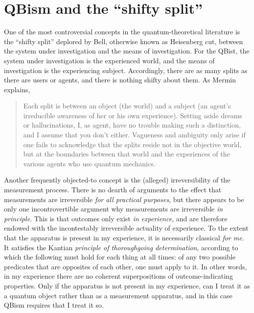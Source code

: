 \documentclass[smallextended]{svjour3}
\newcommand{\bq}{\begin{quote}}
\newcommand{\eq}{\end{quote}}
\begin{document}
\section{QBism and the ``shifty split''}\label{sec_shifty}
One of the most controversial concepts in the quantum-theoretical literature is  the ``shifty split'' deplored by Bell,\cite{Bell90} otherwise known as Heisenberg cut, between the system under investigation and the means of investigation. For the QBist, the system under investigation is the experienced world, and the means of investigation is the experiencing subject. Accordingly, there are as many splits as there are users or agents, and there is nothing shifty about them. As Mermin explains,\cite{Mermin_shifty}
\bq
Each split is between an object (the world) and a subject (an agent's irreducible awareness of her or his own experience). Setting aside dreams or hallucinations, I, as agent, have no trouble making such a distinction, and I assume that you don't either. Vagueness and ambiguity only arise if one fails to acknowledge that the splits reside not in the objective world, but at the boundaries between that world and the experiences of the various agents who use quantum mechanics.
\eq
Another frequently objected-to concept is the (alleged) irreversibility of the {measurement process}. There is no dearth of arguments to the effect that measurements are irreversible \emph{for all practical purposes}, but there appears to be only one incontrovertible argument why measurements are irreversible \emph{in principle}. This is that outcomes only exist \emph{in experience}, and are therefore endowed with the incontestably irreversible actuality of experience. To the extent that the apparatus is present in {my} experience, it is necessarily classical \emph{for me}. It satisfies the Kantian \emph{principle of thoroughgoing determination},\cite{KantCPR1} according to which the following must hold for each thing at all times: of any two possible predicates that are opposites of each other, one must apply to it. In other words, in my experience there are no coherent superpositions of {outcome-indicating} properties. Only if the apparatus is not present in my experience, can I treat it as a quantum object rather than as a measurement apparatus, and in this case QBism requires that I treat it so.
\end{document}
